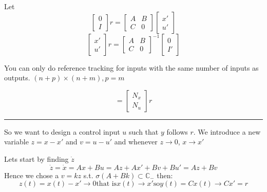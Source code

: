 \documentclass[a4paper]{article}
\begin{document}
Let 
\begin{equation}
\begin{bmatrix}
0 \\
I
\end{bmatrix} r = \begin{bmatrix}
A & B \\
C & 0
\end{bmatrix} \begin{bmatrix}
x' \\
u'
\end{bmatrix} 
\end{equation}
\begin{equation}
\begin{bmatrix}
x' \\
u'
\end{bmatrix} r = \begin{bmatrix}
A & B \\
C & 0
\end{bmatrix}^{-1}  \begin{bmatrix}
0 \\
I'
\end{bmatrix} 
\end{equation}

You can only do reference tracking for inputs with the same number of inputs as outputs.  $ (n+p) \times (n+m), p = m $

\begin{equation}
= \begin{bmatrix}
N_x \\
N_u
\end{bmatrix} r 
\end{equation}

\vspace{5pt}
\hrule
\vspace{5pt}

So we want to design a control input $ u $ such that  $ y $ follows  $ r $.
We introduce a new variable $ z = x - x'$ and $ v = u - u' $ and whenever  $ z \rightarrow 0 $, $ x \rightarrow x' $ 

Lets start by finding $ \dot{z} $
\begin{equation}
\dot{z} = \dot{x} = Ax + Bu = Az + Ax' + Bv + Bu' = Az + Bv
\end{equation}
Hence we chose a $ v = kz $ s.t. $\sigma(A + Bk) \subset \mathbb{C}_{-}$ then:
\begin{equation}
	z(t) = x(t) - x' \rightarrow 0 \text{that is} x(t) \rightarrow x' \text{so} y(t) = C x(t) \rightarrow  C x' = r
\end{equation}
\end{document}
